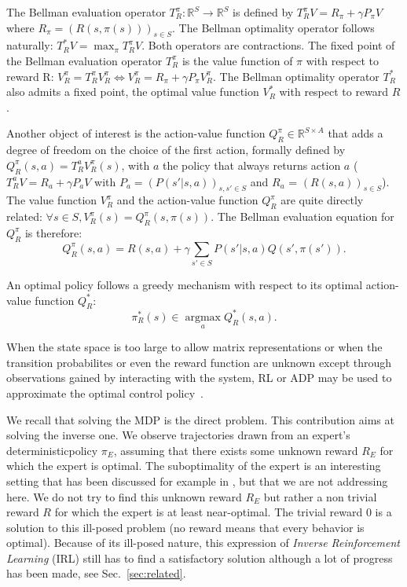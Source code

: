\documentclass{llncs}
\newcommand{\argmax}{\operatorname*{argmax}} %
\begin{document}
The Bellman evaluation operator $T^\pi_R: \mathbb{R}^{S} \rightarrow  \mathbb{R}^{S}$ is defined by
$  T^{\pi}_RV = R_\pi + \gamma P_\pi V$
where $R_\pi = (R(s,\pi(s)))_{s\in S}$. The Bellman optimality operator follows naturally:
 $ T^*_RV = \max_\pi T^\pi_RV$.
  Both operators are contractions. The fixed point of the Bellman evaluation operator $T^\pi_R$ is the value function of $\pi$ with respect to reward R:
    $V^\pi_R = T^\pi_R V^\pi_R \Leftrightarrow V^\pi_R = R_\pi + \gamma P_\pi V^\pi_R$.
The Bellman optimality operator $T^*_R$ also admits a fixed point, the optimal value function $V_R^*$ with respect to reward $R$.

Another object of interest is the action-value function $Q^\pi_R\in\mathbb{R}^{S\times A}$ that adds a degree of freedom on the choice of the first action, formally defined by $Q^\pi_R(s,a) = T^a_RV^\pi_R(s)$, with $a$ the policy that always returns action $a$ ($T^a_RV = R_a + \gamma P_a V$ with $P_a = (P(s'|s,a))_{s,s' \in S}$ and $R_a$ = $(R(s,a))_{s\in S}$). The value function $V^\pi_R$ and the action-value function $Q^\pi_R$ are quite directly related: $\forall s \in S, V^\pi_R(s) = Q^\pi_R(s,\pi(s))$. The Bellman evaluation equation for $Q^\pi_R$ is therefore:
\begin{equation}
  Q^\pi_R(s,a) = R(s,a) + \gamma \sum_{s'\in S}P(s'|s,a) Q(s',\pi(s')).
  \label{eq:bellman1}
\end{equation}

An optimal policy follows a greedy mechanism with respect to its optimal action-value function $Q^*_R$:
\begin{equation}
  \label{eq:greedy}
  \pi^*_R(s)\in\argmax_aQ^*_R(s,a).
\end{equation}

When the state space is too large to allow matrix representations or when the transition probabilites or even the reward function are unknown except through observations gained by interacting with the system, RL or ADP may be used to approximate the optimal control policy~\cite{sutton1998reinforcement}.

We recall that solving the MDP is the direct problem. This contribution aims at solving the inverse one. We observe trajectories drawn from an expert's deterministic\footnotemark[\value{footnote}] policy $\pi_E$, assuming that there exists some unknown reward $R_E$ for which the expert is optimal. The suboptimality of the expert is an interesting setting that has been discussed for example in \cite{melo2010analysis,syed2010reduction}, but that we are not addressing here. We do not try to find this unknown reward $R_E$ but rather a non trivial reward $R$ for which the expert is at least near-optimal. The trivial reward $0$ is a solution to this ill-posed problem (no reward means that every behavior is optimal). Because of its ill-posed nature, this expression of \emph{Inverse Reinforcement Learning} (IRL) still has to find a satisfactory solution although a lot of progress has been made, see Sec.~\ref{sec:related}.
\end{document}
